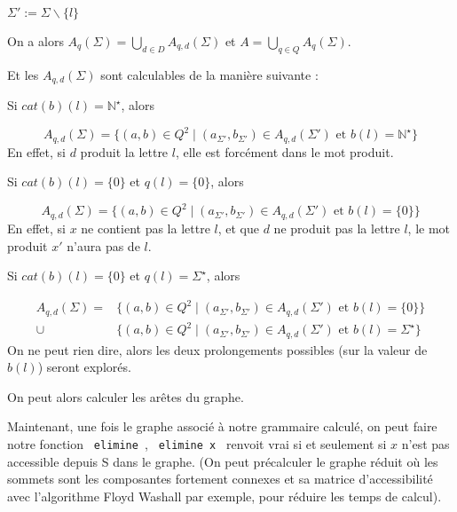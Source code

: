 \documentclass[a4paper,12pt]{article}
\newlength{\mydepth}
\newlength{\myheight}
\newenvironment{answer}
{\par\begin{lrbox}{\mybox}\quad\begin{minipage}{\linewidth}\color{black}\setlength{\parskip}{10pt plus 1pt minus 1pt}\vspace*{-.7\baselineskip}}
{\end{minipage}\end{lrbox}
\settodepth{\mydepth}{\usebox{\mybox}}
\settoheight{\myheight}{\usebox{\mybox}}
\addtolength{\myheight}{\mydepth}
\noindent\makebox[0pt]{
  \color{gray}\hspace{-0pt}\rule[-\mydepth]{1pt}{\myheight}}
  \usebox{\mybox}
  }
\begin{document}
\begin{answer} 
$\Sigma ' := \Sigma \backslash \{l\}$

On a alors $A_q(\Sigma) = \bigcup_{d \in D} A_{q,d}(\Sigma)$ et $A = \bigcup_{q \in Q} A_q(\Sigma)$.

Et les $A_{q,d}(\Sigma)$ sont calculables de la manière suivante : 


Si $cat(b)(l) = \mathbb{N}^\star$, alors
\begin{answer} 
\begin{equation*}A_{q,d}(\Sigma) = \{(a,b) \in Q^2 \mid (a_{\Sigma '},b_{\Sigma '}) \in A_{q,d}(\Sigma ') \text{ et } b(l) = \mathbb{N}^\star\}\end{equation*}
En effet, si $d$ produit la lettre $l$, elle est forcément dans le mot produit.
\end{answer}


Si $cat(b)(l) = \{0\}$ et $q(l) = \{0\}$, alors 
\begin{answer} 
\begin{equation*}A_{q,d}(\Sigma) = \{(a,b) \in Q^2 \mid (a_{\Sigma '},b_{\Sigma '}) \in A_{q,d}(\Sigma ') \text{ et } b(l) = \{0\}\}\end{equation*}
En effet, si $x$ ne contient pas la lettre $l$, et que $d$ ne produit pas la lettre $l$, le mot produit $x'$ n'aura pas de $l$.
\end{answer}


Si $cat(b)(l) = \{0\}$ et $q(l) = \Sigma^\star$, alors
\begin{answer} 
\begin{align*}
A_{q,d}(\Sigma) = &\{(a,b) \in Q^2 \mid (a_{\Sigma '},b_{\Sigma '}) \in A_{q,d}(\Sigma ') \text{ et } b(l) = \{0\}\} \\
\cup &\{(a,b) \in Q^2 \mid (a_{\Sigma '},b_{\Sigma '}) \in A_{q,d}(\Sigma ') \text{ et } b(l) = \Sigma^\star\}
\end{align*}
On ne peut rien dire, alors les deux prolongements possibles (sur la valeur de $b(l)$) seront explorés.
\end{answer}
\end{answer}

On peut alors calculer les arêtes du graphe.

Maintenant, une fois le graphe associé à notre grammaire calculé, on peut faire notre fonction \texttt{ elimine },
 \texttt{ elimine x } renvoit vrai si et seulement si $x$ n'est pas accessible depuis S dans le graphe.
 (On peut précalculer le graphe réduit où les sommets sont les composantes fortement connexes et sa matrice
 d'accessibilité avec l'algorithme Floyd Washall par exemple, pour réduire les temps de calcul).
\end{document}
